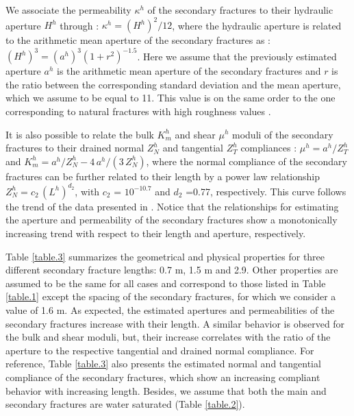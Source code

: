 \documentclass[draft]{agujournal2019}
\begin{document}
We associate the permeability $\kappa^h$ of the secondary fractures to their hydraulic aperture $H^h$ through \cite{Zimmerman1996,Jaeger2009}: $\kappa^h=(H^h)^2/12$, where the hydraulic aperture is related to the arithmetic mean aperture of the secondary fractures as \cite{Renshaw1995, Jaeger2009}: $(H^h)^3=(a^h)^3 ( 1 + r^2)^{-1.5}$. Here we assume that the  previously estimated aperture $a^h$ is the arithmetic mean aperture of the secondary fractures and $r$ is the ratio between the corresponding standard deviation and the mean aperture, which we assume to be equal to 11. This value is on the same order to the one corresponding to natural fractures with high roughness values  \cite{Renshaw1995}.

It is also possible to relate the bulk $K_m^h$ and shear $\mu^h$ moduli of the secondary fractures to their drained normal $Z_N^h$ and tangential $Z_T^h$ compliances \cite{Nakagawa2007,Rubino2014}: $\mu^h = a^h/Z_T^h$ and $K_m^h =a^h/Z_N^h -4 \, a^h/(3\,Z_N^h)$, where the normal compliance of the secondary fractures can be further related to their length by a power law relationship  $Z_N^h = c_2 \, (L^h) ^{d_2}$, with $c_2$ = $10^{-10.7}$ and $d_2$ =0.77, respectively. This curve follows the trend of the data presented in . Notice that the relationships for estimating the aperture and permeability of the secondary fractures show a monotonically increasing trend with respect to their length and aperture, respectively. 

Table \ref{table.3} summarizes the geometrical and physical properties for three different secondary fracture lengths: 0.7 m, 1.5 m and 2.9. Other properties are assumed to be the same for all cases and correspond to those listed in Table \ref{table.1} except the spacing of the secondary fractures, for which we consider a value of 1.6 m.  As expected, the estimated apertures and permeabilities of the secondary fractures increase with their length. A similar behavior is observed for the bulk and shear moduli, but, their increase correlates with the ratio of the aperture to the respective tangential and drained normal compliance.  For reference,  Table \ref{table.3} also presents the estimated normal and tangential compliance of the secondary fractures, which show an increasing compliant behavior with increasing length. Besides, we assume that both the main and secondary fractures are water saturated (Table \ref{table.2}).
\end{document}
